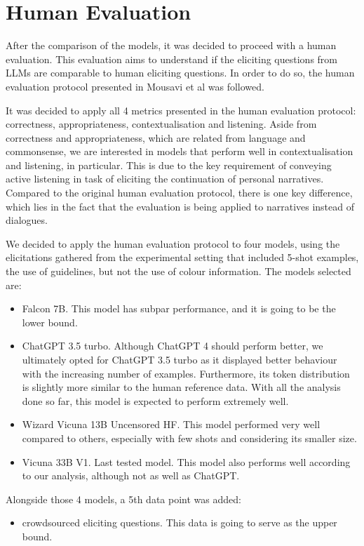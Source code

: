 
\section{Human Evaluation}
After the comparison of the models, it was decided to proceed with a human evaluation. This evaluation aims to understand if the eliciting questions from LLMs are comparable to human eliciting questions. In order to do so, the human evaluation protocol presented in Mousavi et al \cite{mousavi-etal-2022-evaluation} was followed. 

It was decided to apply all 4 metrics presented in the human evaluation protocol: correctness, appropriateness, contextualisation and listening. Aside from correctness and appropriateness, which are related from language and commonsense, we are interested in models that perform well in contextualisation and listening, in particular. This is due to the key requirement of conveying active listening in task of eliciting the continuation of personal narratives. Compared to the original human evaluation protocol, there is one key difference, which lies in the fact that the evaluation is being applied to narratives instead of dialogues. 

We decided to apply the human evaluation protocol to four models, using the elicitations gathered from the experimental setting that included 5-shot examples, the use of guidelines, but not the use of colour information. The models selected are:
\begin{itemize}
\item Falcon 7B. This model has subpar performance, and it is going to be the lower bound.
    \item ChatGPT 3.5 turbo. Although ChatGPT 4 should perform better, we ultimately opted for ChatGPT 3.5 turbo as it displayed better behaviour with the increasing number of examples. Furthermore, its token distribution is slightly more similar to the human reference data. With all the analysis done so far, this model is expected to perform extremely well.
    \item Wizard Vicuna 13B Uncensored HF. This model performed very well compared to others, especially with few shots and considering its smaller size.
    \item Vicuna 33B V1. Last tested model. This model also performs well according to our analysis, although not as well as ChatGPT.
\end{itemize}
Alongside those 4 models, a 5th data point was added:
\begin{itemize}
    \item crowdsourced eliciting questions. This data is going to serve as the upper bound.
\end{itemize}


